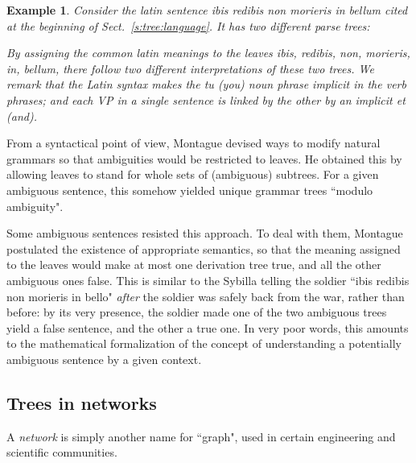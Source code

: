 \documentclass[a4paper]{book}
\theoremstyle{changebreak}                %
\newtheorem{eg}[result]{Example}
\begin{document}
\begin{eg}
\label{eg:ambiguous}
Consider the latin sentence {\it ibis redibis non morieris in bellum}
cited at the beginning of Sect.~\ref{s:tree:language}. It has two
different parse trees:
\begin{center}
\hspace*{1cm}
\end{center}
By assigning the common latin meanings to the leaves {\it ibis},
{\it redibis}, {\it non}, {\it morieris}, {\it in}, {\it bellum},
there follow two different interpretations of these two trees. We
remark that the Latin syntax makes the {\it tu} (you) noun phrase
implicit in the verb phrases; and each VP in a single sentence is
linked by the other by an implicit {\it et} (and).
\end{eg}
From a syntactical point of view, Montague devised ways to modify
natural grammars so that ambiguities would be restricted to leaves. He
obtained this by allowing leaves to stand for whole sets of
(ambiguous) subtrees. For a given ambiguous sentence, this somehow
yielded unique grammar trees ``modulo ambiguity".

Some ambiguous sentences resisted this approach. To deal with them,
Montague postulated the existence of appropriate semantics, so that
the meaning assigned to the leaves would make at most one derivation
tree true, and all the other ambiguous ones false. This is similar to
the Sybilla telling the soldier ``ibis redibis non morieris in bello"
{\it after} the soldier was safely back from the war, rather than
before: by its very presence, the soldier made one of the two
ambiguous trees yield a false sentence, and the other a true one. In
very poor words, this amounts to the mathematical formalization of the
concept of understanding a potentially ambiguous sentence by a given
context.

\subsection{Trees in networks}
\label{s:tree:network}
A {\it network} is simply another name for ``graph",
used in certain engineering and scientific communities.
\end{document}
